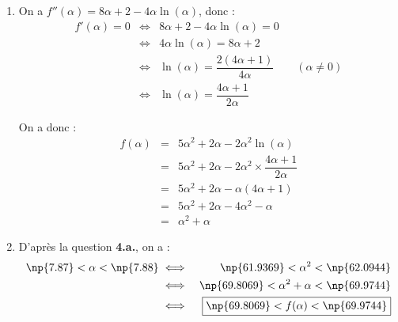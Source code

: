 \begin{enumerate}
\begin{enumerate}
		Sur $[\text{e}~;~+\infty[$, la fonction $f'$ est continue (puisque dérivable) et strictement décroissante. De plus, $f(_text{e}) = 4\text{e} + 2 > 0$ et $\lim\limits_{x \to +\infty}f'(x) = -\infty$. $0 \in ]-\infty~;~4\text{e}+2[$, donc, d'après le corollaire du théorème des valeurs intermédiaires, l'équation $f'(x) = 0$ admet une solution unique $\alpha$ sur $[\text{e}~;~+\infty[$.\\
		\smallskip
		
		Au final, l'équation $f'(x) = 0$ admet une solution unique $\alpha$ sur $]0~;~+\infty[$.\\
		\medskip
		
		On a :
		\[\boxed{\np{7.87} < \alpha < \np{7.88}}\]
		\item On sait que sur $]0~;~\text{e}]$ on a $f'(x) > 0$. Puisque $f'$ est décroissante sur $[\text{e}~;~+\infty[$ et qu'elle s'annule en $\alpha$, $f'(x) \geqslant 0$ sur $[\text{e}~;~\alpha]$ et $f'(x) \leqslant 0$ sur $[\alpha~;~+\infty[$. Donc $f'(x)$ est positif sur $]0~;~\alpha]$ et négatif sur $[\alpha~;~+\infty[$.
		
		\begin{center}
		\end{center}
	\end{enumerate}
	\item On a $f''(\alpha) = 8\alpha + 2 - 4\alpha \ln(\alpha)$, donc :
	\begin{eqnarray*}
		f'(\alpha) = 0 &\iff& 8\alpha + 2 - 4 \alpha \ln(\alpha) = 0\\
		&\iff& 4\alpha\ln(\alpha) = 8\alpha + 2\\
		&\iff& \ln(\alpha) = \dfrac{2(4\alpha+1)}{4\alpha} \qquad (\alpha \neq 0)\\
		&\iff& \boxed{\ln(\alpha) = \dfrac{4\alpha+1}{2\alpha}}
	\end{eqnarray*}
	
	On a donc :
	\begin{eqnarray*}
		f(\alpha) &=& 5\alpha^2 + 2\alpha - 2\alpha^2 \ln(\alpha) \\
		&=& 5\alpha^2 + 2\alpha - 2\alpha^2 \times \dfrac{4\alpha+1}{2\alpha} \\
		&=& 5\alpha^2 + 2\alpha - \alpha(4\alpha + 1) \\
		&=& 5\alpha^2 + 2\alpha - 4\alpha^2 - \alpha \\
		&=& \boxed{\alpha^2  + \alpha}
	\end{eqnarray*}
	\item D'après la question \textbf{4.a.}, on a :
	\begin{eqnarray*}
		\np{7.87} < \alpha < \np{7.88} &\iff& \np{61.9369} < \alpha^2 < \np{62.0944} \\
		&\iff& \np{69.8069} < \alpha^2 + \alpha < \np{69.9744} \\
		&\iff& \boxed{\np{69.8069} < f(\alpha) < \np{69.9744}}
	\end{eqnarray*}
\end{enumerate}
